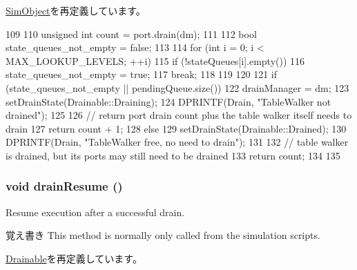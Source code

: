 \hyperlink{classSimObject_a6bf479c521c7c3eb473822d953275b26}{SimObject}を再定義しています。


\begin{DoxyCode}
109 {
110     unsigned int count = port.drain(dm);
111 
112     bool state_queues_not_empty = false;
113 
114     for (int i = 0; i < MAX_LOOKUP_LEVELS; ++i) {
115         if (!stateQueues[i].empty()) {
116             state_queues_not_empty = true;
117             break;
118         }
119     }
120 
121     if (state_queues_not_empty || pendingQueue.size()) {
122         drainManager = dm;
123         setDrainState(Drainable::Draining);
124         DPRINTF(Drain, "TableWalker not drained\n");
125 
126         // return port drain count plus the table walker itself needs to drain
127         return count + 1;
128     } else {
129         setDrainState(Drainable::Drained);
130         DPRINTF(Drain, "TableWalker free, no need to drain\n");
131 
132         // table walker is drained, but its ports may still need to be drained
133         return count;
134     }
135 }
\end{DoxyCode}
\hypertarget{classArmISA_1_1TableWalker_a8f020d3237536fe007fc488c4125c5d8}{
\subsubsection[{drainResume}]{\setlength{\rightskip}{0pt plus 5cm}void drainResume ()}}
\label{classArmISA_1_1TableWalker_a8f020d3237536fe007fc488c4125c5d8}
Resume execution after a successful drain.

\begin{DoxyNote}{覚え書き}
This method is normally only called from the simulation scripts. 
\end{DoxyNote}


\hyperlink{classDrainable_a8f020d3237536fe007fc488c4125c5d8}{Drainable}を再定義しています。


